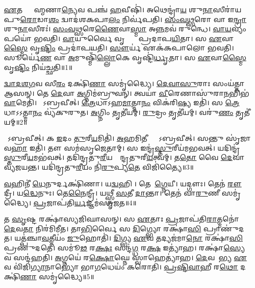 \clearpage
{}
\setcounter{anuvakam}{0}

\ul{𑌏}𑌤𑌦𑍍𑌬𑍍𑌰𑌾᳚𑌹𑍍𑌮𑌣𑌾\ul{𑌨𑍍𑌯𑍇}𑌵 𑌪𑌞𑍍𑌚॑ \ul{𑌹}𑌵𑍀𑌷𑌿॑।
𑌅𑌥𑍇𑌨𑍍𑌦𑍍𑌰𑌾॑\ul{𑌯} 𑌶𑍁\ul{𑌨𑌾}𑌸𑍀𑌰𑌾॑𑌯 𑌪𑍁\ul{𑌰𑍋}𑌡𑌾\ul{𑌶𑌂} 𑌦𑍍𑌵𑌾𑌦॑𑌶𑌕𑌪𑌾\ul{𑌲𑌂} 𑌨𑌿𑌰𑍍𑌵॑𑌪𑌤𑌿।
\ul{𑌸𑌂}\ul{𑌵}\ul{𑌥𑍍𑌸}𑌰𑍋 𑌵𑌾 𑌇\ul{𑌨𑍍𑌦𑍍𑌰𑌾}𑌶𑍁\ul{𑌨𑌾}𑌸𑍀𑌰𑌃॑।
\ul{𑌸𑌂}\ul{𑌵}\ul{𑌥𑍍𑌸}𑌰𑍇\ul{𑌣𑍈}𑌵𑌾\ul{𑌸𑍍𑌮𑌾} 𑌅\ul{𑌨𑍍𑌨}𑌮𑌵॑ 𑌰𑍁𑌨𑍍𑌧𑍇।
\ul{𑌵𑌾}\ul{𑌯}𑌵𑍍𑌯𑌂॑ 𑌪𑌯𑍋॑ 𑌭𑌵𑌤𑌿।
\ul{𑌵𑌾}𑌯𑍁𑌰𑍍𑌵𑍈 𑌵𑍃𑌷𑍍𑌟𑍍𑌯𑍈᳚ 𑌪𑍍𑌰𑌦𑌾𑌪\ul{𑌯𑌿}𑌤𑌾।
𑌸 \ul{𑌏}𑌵𑌾\ul{𑌸𑍍𑌮𑍈} 𑌵𑍃\ul{𑌷𑍍𑌟𑌿𑌂} 𑌪𑍍𑌰𑌦𑌾॑𑌪𑌯𑌤𑌿।
\ul{𑌸𑍗}𑌰𑍍𑌯॑ 𑌏𑌕॑𑌕𑌪𑌾𑌲𑍋 𑌭𑌵𑌤𑌿।
𑌸𑍂𑌰𑍍𑌯𑍇॑\ul{𑌣} 𑌵𑌾 \ul{𑌅}𑌮𑍁𑌷𑍍𑌮𑌿𑌁॑\ul{𑌲𑍍𑌲𑍋}𑌕𑍇 𑌵𑍃𑌷𑍍𑌟𑌿॑\ul{𑌰𑍍𑌧𑍃}𑌤𑌾।
𑌸 \ul{𑌏}𑌵𑌾\ul{𑌸𑍍𑌮𑍈} 𑌵𑍃\ul{𑌷𑍍𑌟𑌿𑌂} 𑌨𑌿𑌯॑𑌚𑍍𑌛𑌤𑌿॥1॥

\ul{𑌦𑍍𑌵𑌾}\ul{𑌦}\ul{𑌶}\ul{𑌗}𑌵 𑌸𑍀\ul{𑌰𑌂} 𑌦𑌕𑍍𑌷𑌿॑\ul{𑌣𑌾} 𑌸𑌮𑍃॑𑌦𑍍𑌧𑍍𑌯𑍈।
\ul{𑌦𑍇}\ul{𑌵𑌾}\ul{𑌸𑍁}𑌰𑌾𑌃 𑌸𑌂𑌯॑𑌤𑍍𑌤𑌾 𑌆𑌸𑌨𑍍।
𑌤𑍇 \ul{𑌦𑍇}𑌵𑌾 \ul{𑌅}𑌗𑍍𑌨𑌿𑌮॑𑌬𑍍𑌰𑍁𑌵𑌨𑍍।
𑌤𑍍𑌵𑌯𑌾॑ \ul{𑌵𑍀}𑌰𑍇𑌣𑌾𑌸𑍁॑𑌰𑌾\ul{𑌨}𑌭𑌿𑌭॑\ul{𑌵𑌾}𑌮𑍇𑌤𑌿॑।
𑌸𑍋᳚𑌽𑌬𑍍𑌰𑌵𑍀𑌤𑍍।
\ul{𑌤𑍍𑌰𑍇}𑌧𑌾\-𑌽𑌹\ul{𑌮𑌾}𑌤𑍍𑌮𑌾\ul{𑌨𑌂} 𑌵𑌿𑌕॑𑌰𑌿\ul{𑌷𑍍𑌯} 𑌇𑌤𑌿॑।
𑌸 \ul{𑌤𑍍𑌰𑍇}𑌧𑌾\-𑌽𑌽𑌤𑍍𑌮𑌾\ul{𑌨𑌂} 𑌵𑍍𑌯॑𑌕𑍁𑌰𑍁𑌤।
\ul{𑌅}𑌗𑍍𑌨𑌿𑌂 𑌤𑍃𑌤𑍀॑𑌯𑌮𑍍।
\ul{𑌰𑍁}𑌦𑍍𑌰𑌂 𑌤𑍃𑌤𑍀॑𑌯𑌮𑍍।
𑌵𑌰𑍁॑\ul{𑌣𑌂} 𑌤𑍃𑌤𑍀॑𑌯𑌮𑍍॥2॥

𑌸𑍋᳚𑌽𑌬𑍍𑌰𑌵𑍀𑌤𑍍।
𑌕 \ul{𑌇}𑌦𑌂 \ul{𑌤𑍁}𑌰𑍀\ul{𑌯}𑌮𑌿𑌤𑌿॑।
\ul{𑌅}𑌹𑌮𑌿𑌤𑍀𑌨𑍍𑌦𑍍𑌰𑍋᳚\-𑌽𑌬𑍍𑌰𑌵𑍀𑌤𑍍।
𑌸𑌨𑍍𑌤𑍁 𑌸𑍃॑𑌜𑌾𑌵\ul{𑌹𑌾} 𑌇𑌤𑌿॑।
𑌤𑍗 𑌸𑌮॑𑌸𑍃𑌜𑍇𑌤𑌾𑌮𑍍।
𑌸 𑌇𑌨𑍍𑌦𑍍𑌰॑\ul{𑌸𑍍𑌤𑍁}𑌰𑍀𑌯॑𑌮𑌭𑌵𑌤𑍍।
𑌯𑌦𑌿𑌨𑍍𑌦𑍍𑌰॑\ul{𑌸𑍍𑌤𑍁}𑌰𑍀\ul{𑌯}𑌮𑌭॑𑌵𑌤𑍍।
𑌤𑌦𑌿॑𑌨𑍍𑌦𑍍𑌰\-𑌤𑍁\ul{𑌰𑍀}𑌯𑌸𑍍𑌯𑍇᳚𑌨𑍍𑌦𑍍𑌰\-𑌤𑍁𑌰𑍀\ul{𑌯}𑌤𑍍𑌵𑌮𑍍।
𑌤\ul{𑌤𑍋} 𑌵𑍈 \ul{𑌦𑍇}𑌵𑌾 𑌵𑍍𑌯॑𑌜𑌯𑌨𑍍𑌤।
𑌯𑌦𑌿॑𑌨𑍍𑌦𑍍𑌰𑌤𑍁\ul{𑌰𑍀}𑌯𑌂 𑌨𑌿॑\ul{𑌰𑍁}𑌪𑍍𑌯\ul{𑌤𑍇} 𑌵𑌿𑌜𑌿॑𑌤𑍍𑌯𑍈॥3॥

\ul{𑌵}𑌹𑌿𑌨𑍀॑ \ul{𑌧𑍇}𑌨𑍁𑌰𑍍𑌦𑌕𑍍𑌷𑌿॑𑌣𑌾।
𑌯\ul{𑌦𑍍𑌵}𑌹𑌿𑌨𑍀᳚।
𑌤𑍇𑌨𑌾᳚\ul{𑌗𑍍𑌨𑍇}𑌯𑍀।
𑌯𑌦𑍍𑌗𑍗𑌃।
𑌤𑍇𑌨॑ \ul{𑌰𑍗}𑌦𑍍𑌰𑍀।
𑌯\ul{𑌦𑍍𑌧𑍇}𑌨𑍁𑌃।
𑌤𑍇\ul{𑌨𑍈}𑌨𑍍𑌦𑍍𑌰𑍀।
𑌯𑌥𑍍𑌸𑍍𑌤𑍍𑌰𑍀 \ul{𑌸}𑌤𑍀 \ul{𑌦𑌾}𑌨𑍍𑌤𑌾।
𑌤𑍇𑌨॑ 𑌵𑌾\ul{𑌰𑍁}𑌣𑍀 𑌸𑌮𑍃॑𑌦𑍍𑌧𑍍𑌯𑍈।
\ul{𑌪𑍍𑌰}𑌜𑌾𑌪॑𑌤𑌿\ul{𑌰𑍍𑌯}𑌜𑍍𑌞𑌮॑𑌸𑍃𑌜𑌤॥4॥

𑌤 \ul{𑌸𑍃}𑌷𑍍𑌟 𑌰𑌕𑍍𑌷𑌾॑𑌸𑍍𑌯𑌜𑌿𑌘𑌾𑌸𑌨𑍍।
𑌸 \ul{𑌏}𑌤𑌾𑌃 \ul{𑌪𑍍𑌰}𑌜𑌾𑌪॑𑌤𑌿\ul{𑌰𑌾}𑌤𑍍𑌮𑌨𑍋॑ \ul{𑌦𑍇}𑌵\ul{𑌤𑌾} 𑌨𑌿𑌰॑𑌮𑌿𑌮𑍀𑌤।
𑌤𑌾\ul{𑌭𑌿}𑌰𑍍𑌵𑍈 𑌸 \ul{𑌦𑌿}𑌗𑍍𑌭𑍍𑌯𑍋 𑌰𑌕𑍍𑌷𑌾॑\ul{𑌸𑌿} 𑌪𑍍𑌰𑌾𑌣𑍁॑𑌦𑌤।
𑌯𑌤𑍍𑌪॑𑌞𑍍𑌚𑌾\ul{𑌵}𑌤𑍍𑌤𑍀𑌯𑌂॑ \ul{𑌜𑍁}𑌹𑍋𑌤𑌿॑।
\ul{𑌦𑌿}𑌗𑍍𑌭𑍍𑌯 \ul{𑌏}𑌵 𑌤𑌦𑍍𑌯𑌜॑𑌮𑌾\ul{𑌨𑍋} 𑌰𑌕𑍍𑌷𑌾॑\ul{𑌸𑌿} 𑌪𑍍𑌰𑌣𑍁॑𑌦𑌤𑍇।
𑌸𑌮𑍂॑\ul{𑌢}\ul{} 𑌰\ul{𑌕𑍍𑌷𑌃} 𑌸𑌨𑍍𑌦॑\ul{𑌗𑍍𑌧}\ul{} 𑌰\ul{𑌕𑍍𑌷} 𑌇𑌤𑍍𑌯𑌾॑𑌹।
𑌰𑌕𑍍𑌷𑌾॑\ul{𑌸𑍍𑌯𑍇}𑌵 𑌸𑌨𑍍𑌦॑𑌹𑌤𑌿।
\ul{𑌅}𑌗𑍍𑌨𑌯𑍇॑ 𑌰\ul{𑌕𑍍𑌷𑍋}𑌘𑍍𑌨𑍇 𑌸𑍍𑌵𑌾𑌹𑍇𑌤𑍍𑌯𑌾॑𑌹।
\ul{𑌦𑍇}𑌵𑌤𑌾᳚𑌭𑍍𑌯 \ul{𑌏}𑌵 𑌵𑌿॑𑌜𑌿\ul{𑌗𑍍𑌯𑌾}𑌨𑌾𑌭𑍍𑌯𑍋॑ 𑌭𑌾\ul{𑌗}𑌧𑍇𑌯𑌂॑ 𑌕𑌰𑍋𑌤𑌿।
\ul{𑌪𑍍𑌰}\ul{𑌷𑍍𑌟𑌿}\ul{𑌵𑌾}𑌹𑍀 𑌰\ul{𑌥𑍋} 𑌦𑌕𑍍𑌷𑌿॑\ul{𑌣𑌾} 𑌸𑌮𑍃॑𑌦𑍍𑌧𑍍𑌯𑍈॥5॥

